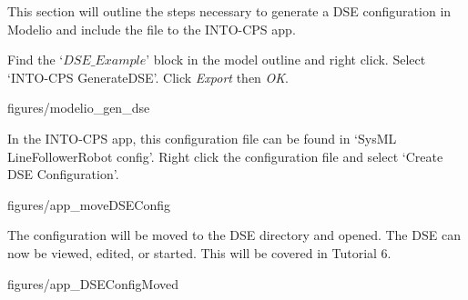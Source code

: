 \documentclass[11pt,a4paper]{../tutorial}
\begin{document}
This section will outline the steps necessary to generate a DSE configuration in Modelio and include the file to the INTO-CPS app.

\begin{instructions}

\item Find the `$DSE\_Example$' block in the model outline and right click. Select `INTO-CPS \menusep GenerateDSE'. Click \emph{Export} then \emph{OK}.

\begin{center}
\begin{annotation}[width=0.7\linewidth]{figures/modelio_gen_dse}
    \end{annotation}
\end{center}


In the INTO-CPS app, this configuration file can be found in `SysML \menusep LineFollowerRobot \menusep config’. Right click the configuration file and select `Create DSE Configuration’.

\begin{center}
\begin{annotation}[width=0.7\linewidth]{figures/app_moveDSEConfig}
    \end{annotation}
\end{center}

\newpage

The configuration will be moved to the DSE directory and opened. The DSE can now be viewed, edited, or started. This will be covered in Tutorial 6.

\begin{center}
\begin{annotation}[width=0.7\linewidth]{figures/app_DSEConfigMoved}
    \end{annotation}
\end{center}

\end{instructions}
\end{document}
